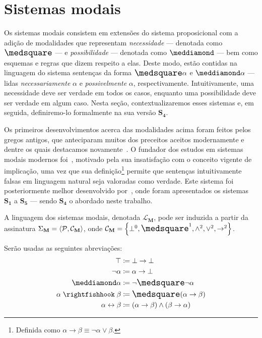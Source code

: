 \section{Sistemas modais}
    Os sistemas modais consistem em extensões do sistema proposicional com a adição de modalidades que representam \emph{necessidade} --- denotada como $\nec$ --- e \emph{possibilidade} --- denotada como $\pos$ --- bem como esquemas e regras que dizem respeito a elas. Deste modo, estão contidas na linguagem do sistema sentenças da forma $\nec\alpha$ e $\pos\alpha$ --- lidas \emph{necessariamente} $\alpha$ e \emph{possivelmente} $\alpha$, respectivamente. Intuitivamente, uma necessidade deve ser verdade em todos os casos, enquanto uma possibilidade deve ser verdade em algum caso. Nesta seção, contextualizaremos esses sistemas e, em seguida, definiremo-lo formalmente na sua versão $\mathbf{S_4}$.

    Os primeiros desenvolvimentos acerca das modalidades acima foram feitos pelos gregos antigos, que anteciparam muitos dos preceitos aceitos modernamente e dentre os quais destacamos novamente~\cite{Aristotle}. O fundador dos estudos em sistemas modais modernos foi~\cite{Lewis}, motivado pela sua insatisfação com o conceito vigente de implicação, uma vez que sua definição\footnote{Definida como $\alpha\to\beta\equiv\neg\alpha\vee\beta$.} permite que sentenças intuitivamente falsas em linguagem natural seja valoradas como verdade. Este sistema foi posteriormente melhor desenvolvido por~\cite{Langford}, onde foram apresentados os sistemas $\mathbf{S_1}$ a $\mathbf{S_5}$ --- sendo $\mathbf{S_4}$ o abordado neste trabalho.

    \begin{definition}
        A linguagem dos sistemas modais, denotada $\mathcal{L}_\mathbf{M}$, pode ser induzida a partir da assinatura $\Sigma_\mathbf{M}=\langle\mathcal{P},\mathcal{C}_\mathbf{M}\rangle$, onde $\mathcal{C}_\mathbf{M}=\set{\bot^0,\nec^1,\wedge^2,\vee^2,\to^2}$.
    \end{definition}

    \begin{notation}
        Serão usadas as seguintes abreviações:
        \begin{align*}
            \top&\coloneqq\bot\to\bot\\
            \neg\alpha&\coloneqq\alpha\to\bot\\
            \pos\alpha&\coloneqq\neg\nec\neg\alpha\\
            \alpha\strictif\beta&\coloneqq\nec(\alpha\to\beta)\\
            \alpha\leftrightarrow\beta&\coloneqq(\alpha\to\beta)\wedge(\beta\to\alpha)
        \end{align*}
    \end{notation}

